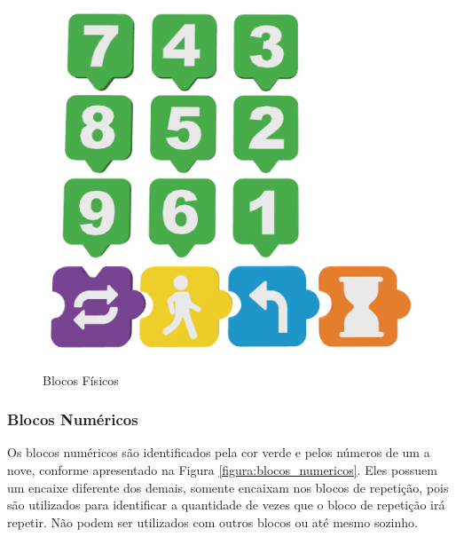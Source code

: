     \begin{figure}[H]
        \caption{Blocos Físicos}
        \centering
        \includegraphics[width=\linewidth]{Imagens/Cap3/Blocos/Todos.png}
        \label{figura:blocos_fisicos}
    \end{figure}
    
    \subsubsection{Blocos Numéricos}
        Os blocos numéricos são identificados pela cor verde e pelos números de um a nove, conforme apresentado na Figura \ref{figura:blocos_numericos}. Eles possuem um encaixe diferente dos demais, somente encaixam nos blocos de repetição, pois são utilizados para identificar a quantidade de vezes que o bloco de repetição irá repetir. Não podem ser utilizados com outros blocos ou até mesmo sozinho.
        

